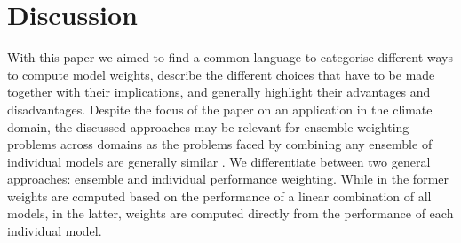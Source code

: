 \section{Discussion}\label{sec:discussion}

With this paper we aimed to find a common language to categorise different ways to compute model weights, describe the different choices that have to be made together with their implications, and generally highlight their advantages and disadvantages. 
Despite the focus of the paper on an application in the climate domain, the discussed approaches may be relevant for ensemble weighting problems across domains as the problems faced by combining any ensemble of individual models are generally similar \citep[e.g., see][]{riccioSeekingRationalBasis2007,potempskiEstModusRebus2009,solazzoPauciExTanto2013}.
We differentiate between two general approaches: ensemble and individual performance weighting. While in the former weights are computed based on the performance of a linear combination of all models, in the latter, weights are computed directly from the performance of each individual model.

